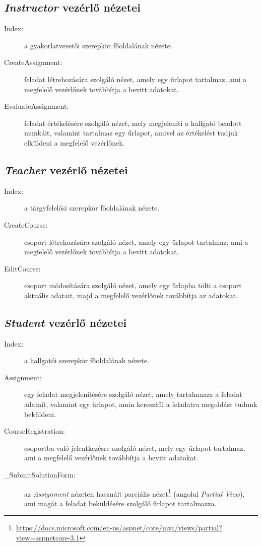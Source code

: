 \subsection{\emph{Instructor} vezérlő nézetei}
\begin{description}
	\item[Index:] a gyakorlatvezetői szerepkör főoldalának nézete.
	\item[CreateAssignment:] feladat létrehozására szolgáló nézet, amely egy űrlapot tartalmaz, ami a megfelelő vezérlőnek továbbítja a bevitt adatokat. 
	\item[EvaluateAssignment:] feladat értékelésére szolgáló nézet, mely megjeleníti a hallgató beadott munkáit, valamint tartalmaz egy űrlapot, amivel az értékelést tudjuk elküldeni a megfelelő vezérlőnek.
\end{description}
\subsection{\emph{Teacher} vezérlő nézetei}
\begin{description}
	\item[Index:] a tárgyfelelősi szerepkör főoldalának nézete.
	\item[CreateCourse:] csoport létrehozására szolgáló nézet, amely egy űrlapot tartalmaz, ami a megfelelő vezérlőnek továbbítja a bevitt adatokat. 
	\item[EditCourse:] csoport módosítására szolgáló nézet, amely egy űrlapba tölti a csoport aktuális adatait, majd a megfelelő vezérlőnek továbbítja az adatokat. 
\end{description}
\subsection{\emph{Student} vezérlő nézetei}
\begin{description}
	\item[Index:] a hallgatói szerepkör főoldalának nézete.
	\item[Assignment:] egy feladat megjelenítésére szolgáló nézet, amely tartalmazza a feladat adatait, valamint egy űrlapot, amin keresztül a feladatra megoldást tudunk beküldeni.
	\item[CourseRegistration:] csoportba való jelentkezésre szolgáló nézet, mely egy űrlapot tartalmaz, ami a megfelelő vezérlőnek továbbítja a bevitt adatokat.
	\item[\_SubmitSolutionForm:] az \emph{Assignment} nézeten használt parciális nézet\footnote{\url{https://docs.microsoft.com/en-us/aspnet/core/mvc/views/partial?view=aspnetcore-3.1}} (angolul \emph{Partial View}), ami magát a feladat beküldésére szolgáló űrlapot tartalmazza.
\end{description}
